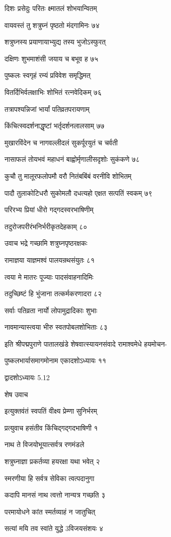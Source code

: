 दिशः प्रसेदुः परितः क्ष्मातलं शोभयान्वितम्

वायवस्तं तु शत्रुघ्नं पृष्ठतो मंदगामिनः ७४

शत्रुघ्नस्य प्रयाणायाभ्युद्य तस्य भुजोऽस्फुरत्

दक्षिणः शुभमाशंसी जयाय च बभूव ह ७५

पुष्कलः स्वगृहं रम्यं प्रविवेश समृद्धिमत्

वितर्दिभिर्वलक्षाभिः शोभितं रत्नवेदिकम् ७६

तत्रापश्यन्निजां भार्यां पतिव्रतपरायणाम्

किंचित्स्वदर्शनाद्धृष्टां भर्तृदर्शनलालसाम् ७७

मुखारविंदेन च नागवल्लीदलं सुकर्पूरयुतं च चर्वती

नासाफलं तोयभवं महाधनं बाह्वोर्मृणालीसदृशोः सुकंकणे ७८

कुचौ तु मालूरफलोपमौ वरौ नितंबबिंबं वरनीवि शोभितम्

पादौ तुलाकोटिधरौ सुकोमलौ दधत्यहो एक्षत सत्पतिं स्वकम् ७९

परिरभ्य प्रियां धीरो गद्गदस्वरभाषिणीम्

तदुरोजपरीरंभनिर्भरीकृतदेहकाम् ८०

उवाच भद्रे गच्छामि शत्रुघ्नपृष्ठरक्षकः

रामाज्ञया याज्ञमश्वं पालयन्रथसंयुतः ८१

त्वया मे मातरः पूज्याः पादसंवाहनादिमिः

तदुच्छिष्टं हि भुंजाना तत्कर्मकरणादरा ८२

सर्वाः पतिव्रता नार्यो लोपामुद्रादिकाः शुभाः

नावमान्यास्त्वया भीरु स्वतपोबलशोभिताः ८३

इति श्रीपद्मपुराणे पातालखंडे शेषवात्स्यायनसंवादे रामाश्वमेधे हयमोचन-

पुष्कलभार्यासमागमोनाम एकादशोऽध्यायः ११

द्वादशोऽध्यायः 5.12

शेष उवाच

इत्युक्तवंतं स्वपतिं वीक्ष्य प्रेम्णा सुनिर्भरम्

प्रत्युवाच हसंतीव किंचिद्गद्गदभाषिणी १

नाथ ते विजयोभूयात्सर्वत्र रणमंडले

शत्रुघ्नाज्ञा प्रकर्तव्या हयरक्षा यथा भवेत् २

स्मरणीया हि सर्वत्र सेविका त्वत्पदानुगा

कदापि मानसं नाथ त्वत्तो नान्यत्र गच्छति ३

परमायोधने कांत स्मर्तव्याहं न जातुचित्

सत्यां मयि तव स्वांते युद्धे 3विजयसंशयः ४

